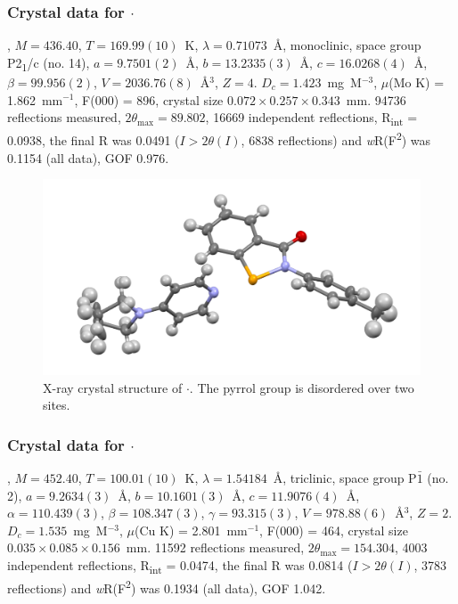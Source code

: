 \begin{refsection}
\subsubsection{Crystal data for \texorpdfstring{$ \cdot $}{C23 H23 N3 O Se}}
, $M=436.40$, $T=169.99(10)$~K, $ \lambda=0.71073 $~\AA, monoclinic, space group P2\textsubscript{1}/c (no. 14), $a = 9.7501(2)$~\AA, $b = 13.2335(3)$~\AA, $c = 16.0268(4)$~\AA, $\beta = 99.956(2)$\degree, $V = 2036.76(8)$~\AA$^{3}$, $Z = 4$. $D_{c}= 1.423$~mg~M$^{-3}$, $\mu$(Mo K\a) = 1.862~mm$^{-1}$, F(000) = 896, crystal size $0.072 \times 0.257 \times 0.343$~mm. 94736 reflections measured, $2\theta_{\max}=89.802$\degree, 16669 independent reflections, R\textsubscript{int} = 0.0938, the final R was 0.0491 ($I > 2\theta(I)$, 6838 reflections) and \textit{w}R(F\textsuperscript{2}) was 0.1154 (all data), GOF 0.976.

\begin{figure}
  \includegraphics[width=0.6\linewidth]{Figures/ebs-4me-pyrrol-xtal.pdf}
  \caption[X-ray crystal structure of \texorpdfstring{$ \cdot $}{C23 H23 N3 O Se}.]{X-ray crystal structure of \texorpdfstring{$ \cdot $}{C23 H23 N3 O Se}. The pyrrol group is disordered over two sites.}
\end{figure}

\subsubsection{Crystal data for \texorpdfstring{$ \cdot $}{C23 H23 N3 O2 Se}}
, $M=452.40$, $T=100.01(10)$~K, $\lambda=1.54184$~\AA, triclinic, space group P$\bar{1}$ (no. 2), $a = 9.2634(3)$~\AA, $b = 10.1601(3)$~\AA, $c = 11.9076(4)$~\AA, $\alpha = 110.439(3)$\degree, $\beta = 108.347(3)$\degree, $\gamma = 93.315(3)$\degree, $V = 978.88(6)$~\AA$^{3}$, $Z = 2$. $D_{c}= 1.535$~mg~M$^{-3}$, $\mu$(Cu K\a) = 2.801~mm$^{-1}$, F(000) = 464, crystal size $0.035 \times 0.085 \times 0.156$~mm. 11592 reflections measured, $2\theta_{\max}=154.304$\degree, 4003 independent reflections, R\textsubscript{int} = 0.0474, the final R was 0.0814 ($I > 2\theta(I)$, 3783 reflections) and \textit{w}R(F\textsuperscript{2}) was 0.1934 (all data), GOF 1.042.


\end{refsection}
